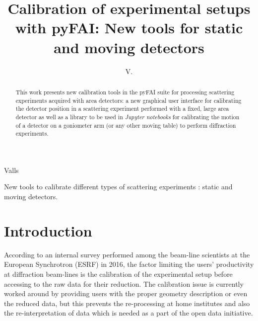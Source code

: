 \documentclass[preprint]{iucr}              %
\begin{document}

\title{Calibration of experimental setups with {pyFAI}: New tools for static
and moving detectors}

 \author[a]{V.}{Valls}
 
 





\maketitle                        %

\begin{synopsis}
New tools to calibrate different types of scattering experiments : static
and moving detectors.
\end{synopsis}

\begin{abstract}


This work presents new calibration tools in the pyFAI
suite for processing scattering experiments acquired with area detectors:
a new graphical user interface for calibrating the detector position in a  
scattering experiment performed with a fixed, large area detector as well as 
a library to be used in \textit{Jupyter notebooks} for calibrating the motion
of a detector on a goniometer arm (or any other moving table) to perform
diffraction experiments.
\end{abstract}


\section{Introduction}

According to an internal survey performed among the beam-line scientists at
the European Synchrotron (ESRF) in 2016, the factor limiting the users'
productivity at diffraction beam-lines is the calibration of the experimental
setup before accessing to the raw data for their reduction. 
The calibration issue is currently worked around by providing users with the
proper geometry description or even the reduced data, but this prevents the
re-processing at home institutes and also the re-interpretation of data which
is needed as a part of the open data initiative.
\end{document}
